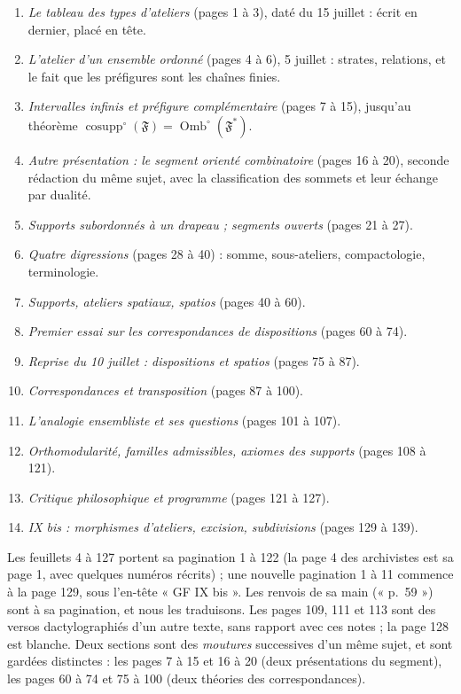 \documentclass[11pt,a4paper]{article}
\begin{document}
\begin{enumerate}
\item[1.] \emph{Le tableau des types d'ateliers} (pages 1 à 3), daté du 15
juillet : écrit en dernier, placé en tête.
\item[2.] \emph{L'atelier d'un ensemble ordonné} (pages 4 à 6), 5 juillet :
strates, relations, et le fait que les préfigures sont les chaînes finies.
\item[3.] \emph{Intervalles infinis et préfigure complémentaire} (pages 7 à
15), jusqu'au théorème $\operatorname{cosupp}^{\circ}(\mathfrak{F}) =
\operatorname{Omb}^{\circ}(\mathfrak{F}^{*})$.
\item[4.] \emph{Autre présentation : le segment orienté combinatoire} (pages 16
à 20), seconde rédaction du même sujet, avec la classification des sommets et
leur échange par dualité.
\item[5.] \emph{Supports subordonnés à un drapeau ; segments ouverts} (pages 21
à 27).
\item[6.] \emph{Quatre digressions} (pages 28 à 40) : somme, sous-ateliers,
compactologie, terminologie.
\item[7.] \emph{Supports, ateliers spatiaux, spatios} (pages 40 à 60).
\item[8.] \emph{Premier essai sur les correspondances de dispositions} (pages 60
à 74).
\item[9.] \emph{Reprise du 10 juillet : dispositions et spatios} (pages 75 à
87).
\item[10.] \emph{Correspondances et transposition} (pages 87 à 100).
\item[11.] \emph{L'analogie ensembliste et ses questions} (pages 101 à 107).
\item[12.] \emph{Orthomodularité, familles admissibles, axiomes des supports}
(pages 108 à 121).
\item[13.] \emph{Critique philosophique et programme} (pages 121 à 127).
\item[14.] \emph{IX bis : morphismes d'ateliers, excision, subdivisions} (pages
129 à 139).
\end{enumerate}

Les feuillets 4 à 127 portent sa pagination 1 à 122 (la page 4 des archivistes
est sa page 1, avec quelques numéros récrits) ; une nouvelle pagination 1 à 11
commence à la page 129, sous l'en-tête « GF IX bis ». Les renvois de sa main
(« p.~59 ») sont à sa pagination, et nous les traduisons. Les pages 109, 111 et
113 sont des versos dactylographiés d'un autre texte, sans rapport avec ces
notes ; la page 128 est blanche. Deux sections sont des \emph{moutures}
successives d'un même sujet, et sont gardées distinctes : les pages 7 à 15 et
16 à 20 (deux présentations du segment), les pages 60 à 74 et 75 à 100 (deux
théories des correspondances).
\end{document}
